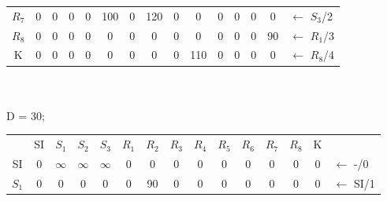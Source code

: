 \documentclass[12pt]{article}
\begin{document}
\begin{enumerate}
\begin{tabular}{|c|c|c|c|c|c|c|c|c|c|c|c|c|c|l}
$R_7$ & 0   & {\color[HTML]{000000} 0}        & {\color[HTML]{000000} 0}        & {\color[HTML]{000000} 0}        & {\color[HTML]{000000} 100} & {\color[HTML]{000000} 0}   & {\color[HTML]{000000} 120} & {\color[HTML]{000000} 0}  & {\color[HTML]{000000} 0}   & {\color[HTML]{000000} 0}   & {\color[HTML]{000000} 0}   & {\color[HTML]{000000} 0}   & {\color[HTML]{000000} 0}   & ${\leftarrow}$ $S_3$/2 \\ \cline{1-14}
$R_8$ & 0   & {\color[HTML]{000000} 0}        & {\color[HTML]{000000} 0}        & {\color[HTML]{000000} 0}        & {\color[HTML]{000000} 0}   & {\color[HTML]{000000} 0}   & {\color[HTML]{000000} 0}   & {\color[HTML]{000000} 0}  & {\color[HTML]{000000} 0}   & {\color[HTML]{000000} 0}   & {\color[HTML]{000000} 0}   & {\color[HTML]{000000} 0}   & {\color[HTML]{FE0000} 90}  & ${\leftarrow}$ $R_1$/3 \\ \cline{1-14}
K     & 0   & {\color[HTML]{000000} 0}        & {\color[HTML]{000000} 0}        & {\color[HTML]{000000} 0}        & {\color[HTML]{000000} 0}   & {\color[HTML]{000000} 0}   & {\color[HTML]{000000} 0}   & {\color[HTML]{000000} 0}  & {\color[HTML]{000000} 110} & {\color[HTML]{000000} 0}   & {\color[HTML]{000000} 0}   & {\color[HTML]{000000} 0}   & {\color[HTML]{000000} 0}   & ${\leftarrow}$ $R_8$/4 \\ \cline{1-14}
\end{tabular}
\\
\\
D = 30;
\\
\newpage
\begin{tabular}{|c|c|c|c|c|c|c|c|c|c|c|c|c|c|l}
\cline{1-14}
      & SI  & $S_1$                           & $S_2$                           & $S_3$                           & $R_1$                      & $R_2$                      & $R_3$                      & $R_4$                     & $R_5$                      & $R_6$                      & $R_7$                      & $R_8$                      & K                          &                        \\ \cline{1-14}
SI    & 0   & {\color[HTML]{000000} $\infty$} & {\color[HTML]{FE0000} $\infty$} & {\color[HTML]{000000} $\infty$} & {\color[HTML]{000000} 0}   & {\color[HTML]{000000} 0}   & {\color[HTML]{000000} 0}   & {\color[HTML]{000000} 0}  & {\color[HTML]{000000} 0}   & {\color[HTML]{000000} 0}   & {\color[HTML]{000000} 0}   & {\color[HTML]{000000} 0}   & {\color[HTML]{000000} 0}   & ${\leftarrow}$ -/0     \\ \cline{1-14}
$S_1$ & 0   & {\color[HTML]{000000} 0}        & {\color[HTML]{000000} 0}        & {\color[HTML]{000000} 0}        & {\color[HTML]{000000} 0}   & {\color[HTML]{000000} 90}  & {\color[HTML]{000000} 0}   & {\color[HTML]{000000} 0}  & {\color[HTML]{000000} 0}   & {\color[HTML]{000000} 0}   & {\color[HTML]{000000} 0}   & {\color[HTML]{000000} 0}   & {\color[HTML]{000000} 0}   & ${\leftarrow}$ SI/1    \\ \cline{1-14}

\end{tabular}
\end{enumerate}
\end{document}
